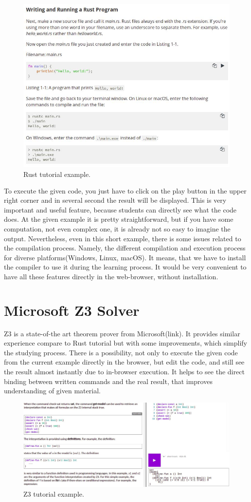 \begin{figure}[h!]
    \centering
    \includegraphics[width=0.7\linewidth]{src/pic/rust}
    \caption{Rust tutorial example.}
    \label{fig:rust}
\end{figure}

To execute the given code, you just have to click on the play button in the upper right corner and in several second the result will be displayed. This is very important and useful feature, because students can directly see what the code does. At the given example it is pretty straightforward, but if you have some computation, not even complex one, it is already not so easy to imagine the output.
Nevertheless, even in this short example, there is some issues related to the compilation process. Namely, the different compilation and execution process for diverse platforms(Windows, Linux, macOS). It means, that we have to install the compiler to use it during the learning process. It would be very convenient to have all these features directly in the web-browser, without installation.

\section{Microsoft Z3 Solver}
Z3 is a state-of-the art theorem prover from Microsoft(link). It provides similar experience compare to Rust tutorial but with some improvements, which simplify the studying process. There is a possibility, not only to execute the given code from the current example directly in the browser, but edit the code, and still see the result almost instantly due to in-browser execution. It helps to see the direct binding between written commands and the real result, that improves understanding of given material.

\begin{figure}[h!]
    \centering
    \includegraphics[width=\linewidth]{src/pic/z3}
    \caption{Z3 tutorial example.}
    \label{fig:z3}
\end{figure}


